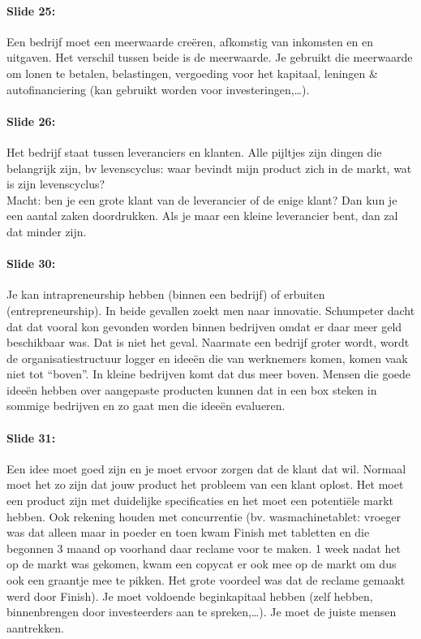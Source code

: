 \documentclass[10pt,a4paper]{report}
\begin{document}
\paragraph{Slide 25:} Een bedrijf moet een meerwaarde cre\"eren, afkomstig van inkomsten en en uitgaven. Het verschil tussen beide is de meerwaarde. Je gebruikt die meerwaarde om lonen te betalen, belastingen, vergoeding voor het kapitaal, leningen $\&$ autofinanciering (kan gebruikt worden voor investeringen,…).

\paragraph{Slide 26:} Het bedrijf staat tussen leveranciers en klanten. Alle pijltjes zijn dingen die belangrijk zijn, bv levenscyclus: waar bevindt mijn product zich in de markt, wat is zijn levenscyclus?\\ Macht: ben je een grote klant van de leverancier of de enige klant? Dan kun je een aantal zaken doordrukken. Als je maar een kleine leverancier bent, dan zal dat minder zijn.

\paragraph{Slide 30:} Je kan intrapreneurship hebben (binnen een bedrijf) of erbuiten (entrepreneurship). In beide gevallen zoekt men naar innovatie. Schumpeter dacht dat dat vooral kon gevonden worden binnen bedrijven omdat er daar meer geld beschikbaar was. Dat is niet het geval. Naarmate een bedrijf groter wordt, wordt de organisatiestructuur logger en idee\"en die van werknemers komen, komen vaak niet tot ``boven''. In kleine bedrijven komt dat dus meer boven. Mensen die goede idee\"en hebben over aangepaste producten kunnen dat in een box steken in sommige bedrijven en zo gaat men die idee\"en evalueren.

\paragraph{Slide 31:} Een idee moet goed zijn en je moet ervoor zorgen dat de klant dat wil. Normaal moet het zo zijn dat jouw product het probleem van een klant oplost. Het moet een product zijn met duidelijke specificaties en het moet een potenti\"ele markt hebben. Ook rekening houden met concurrentie (bv. wasmachinetablet: vroeger was dat alleen maar in poeder en toen kwam Finish met tabletten en die begonnen 3 maand op voorhand daar reclame voor te maken. 1 week nadat het op de markt was gekomen, kwam een copycat er ook mee op de markt om dus ook een graantje mee te pikken. Het grote voordeel was dat de reclame gemaakt werd door Finish). Je moet voldoende beginkapitaal hebben (zelf hebben, binnenbrengen door investeerders aan te spreken,…). Je moet de juiste mensen aantrekken.
\end{document}
